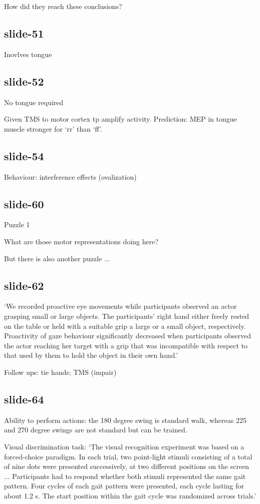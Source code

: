 \documentclass[12pt,\papersize]{extarticle}
\begin{document}
How did they reach these conclusions?

\subsection{slide-51}
Inovlves tongue

\subsection{slide-52}
No tongue required

Given TMS to motor cortex tp amplify activity.
Prediction: MEP in tongue muscle stronger for ‘rr’ than ‘ff’.

\subsection{slide-54}
Behaviour: interference effects (ovalization)

\subsection{slide-60}
Puzzle 1



What are those motor representations doing here?


But there is also another puzzle ...

\subsection{slide-62}
‘We recorded proactive eye movements while participants observed an actor grasping small or large
objects. The participants' right hand either freely rested on the table or held with a suitable grip
a large or a small object, respectively. Proactivity of gaze behaviour significantly decreased when
participants observed the actor reaching her target with a grip that was incompatible with respect to
that used by them to hold the object in their own hand.’

Follow ups: tie hands; TMS (impair)

\subsection{slide-64}
Ability to perform actions: the 180 degree swing is standard walk, whereas
225 and 270 degree swings are not standard but can be trained.

Visual discrimination task: ‘The visual recognition experiment was based on a forced-choice
paradigm. In each trial, two point-light stimuli consisting of a total of nine dots were presented
successively, at two different positions on the screen ... Participants had to respond whether both
stimuli represented the same gait pattern. Four cycles of each gait pattern were presented, each
cycle lasting for about 1.2 s. The start position within the gait cycle was randomized across
trials.’
\end{document}
